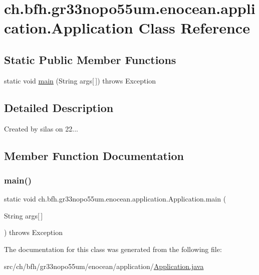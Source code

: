 \hypertarget{classch_1_1bfh_1_1gr33nopo55um_1_1enocean_1_1application_1_1_application}{}\section{ch.\+bfh.\+gr33nopo55um.\+enocean.\+application.\+Application Class Reference}
\label{classch_1_1bfh_1_1gr33nopo55um_1_1enocean_1_1application_1_1_application}
\subsection*{Static Public Member Functions}
\begin{DoxyCompactItemize}
\item 
static void \hyperlink{classch_1_1bfh_1_1gr33nopo55um_1_1enocean_1_1application_1_1_application_ab7d05ca9d276ed9bdb1a82ee390c24e7}{main} (String args\mbox{[}$\,$\mbox{]})  throws Exception 
\end{DoxyCompactItemize}


\subsection{Detailed Description}
Created by silas on 22... 

\subsection{Member Function Documentation}
\hypertarget{classch_1_1bfh_1_1gr33nopo55um_1_1enocean_1_1application_1_1_application_ab7d05ca9d276ed9bdb1a82ee390c24e7}{}\label{classch_1_1bfh_1_1gr33nopo55um_1_1enocean_1_1application_1_1_application_ab7d05ca9d276ed9bdb1a82ee390c24e7} 
\subsubsection{\texorpdfstring{main()}{main()}}
{\footnotesize\ttfamily static void ch.\+bfh.\+gr33nopo55um.\+enocean.\+application.\+Application.\+main (\begin{DoxyParamCaption}\item[{String}]{args\mbox{[}$\,$\mbox{]} }\end{DoxyParamCaption}) throws Exception\hspace{0.3cm}{\ttfamily [static]}}



The documentation for this class was generated from the following file\+:\begin{DoxyCompactItemize}
\item 
src/ch/bfh/gr33nopo55um/enocean/application/\hyperlink{_application_8java}{Application.\+java}\end{DoxyCompactItemize}
